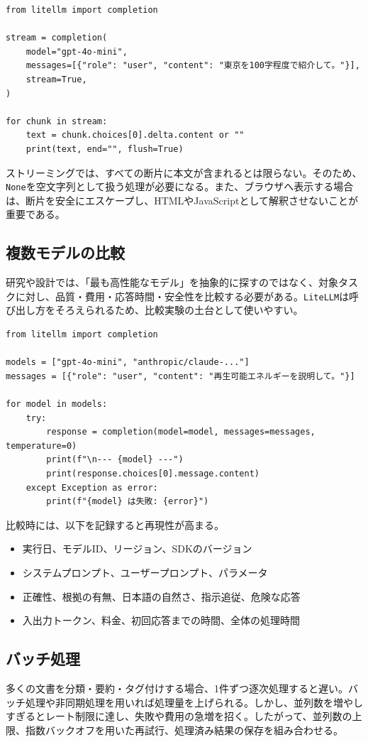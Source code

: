\documentclass[11pt,a4paper]{bxjsarticle}
\newcommand{\litellm}{\texttt{LiteLLM}}
\begin{document}
\begin{lstlisting}[style=python,caption={ストリーミング出力例}]
from litellm import completion

stream = completion(
    model="gpt-4o-mini",
    messages=[{"role": "user", "content": "東京を100字程度で紹介して。"}],
    stream=True,
)

for chunk in stream:
    text = chunk.choices[0].delta.content or ""
    print(text, end="", flush=True)
\end{lstlisting}

ストリーミングでは、すべての断片に本文が含まれるとは限らない。そのため、\texttt{None}を空文字列として扱う処理が必要になる。また、ブラウザへ表示する場合は、断片を安全にエスケープし、HTMLやJavaScriptとして解釈させないことが重要である。

\subsection{複数モデルの比較}
研究や設計では、「最も高性能なモデル」を抽象的に探すのではなく、対象タスクに対し、品質・費用・応答時間・安全性を比較する必要がある。\litellm{}は呼び出し方をそろえられるため、比較実験の土台として使いやすい。

\begin{lstlisting}[style=python,caption={同一質問を複数モデルで比較する概念例}]
from litellm import completion

models = ["gpt-4o-mini", "anthropic/claude-..."]
messages = [{"role": "user", "content": "再生可能エネルギーを説明して。"}]

for model in models:
    try:
        response = completion(model=model, messages=messages, temperature=0)
        print(f"\n--- {model} ---")
        print(response.choices[0].message.content)
    except Exception as error:
        print(f"{model} は失敗: {error}")
\end{lstlisting}

比較時には、以下を記録すると再現性が高まる。
\begin{itemize}
  \item 実行日、モデルID、リージョン、SDKのバージョン
  \item システムプロンプト、ユーザープロンプト、パラメータ
  \item 正確性、根拠の有無、日本語の自然さ、指示追従、危険な応答
  \item 入出力トークン、料金、初回応答までの時間、全体の処理時間
\end{itemize}

\subsection{バッチ処理}
多くの文書を分類・要約・タグ付けする場合、1件ずつ逐次処理すると遅い。バッチ処理や非同期処理を用いれば処理量を上げられる。しかし、並列数を増やしすぎるとレート制限に達し、失敗や費用の急増を招く。したがって、並列数の上限、指数バックオフを用いた再試行、処理済み結果の保存を組み合わせる。
\end{document}
